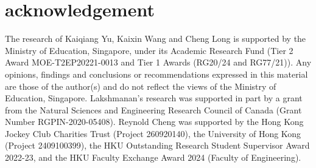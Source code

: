 \section{acknowledgement}
The research of Kaiqiang Yu, Kaixin Wang and Cheng Long is supported by the Ministry of Education, Singapore, under its Academic Research Fund (Tier 2 Award MOE-T2EP20221-0013 and Tier 1 Awards (RG20/24 and RG77/21)). Any opinions, findings and conclusions or recommendations expressed in this material are those of the author(s) and do not reflect the views of the Ministry of Education, Singapore.
%
Lakshmanan’s research was supported in part by a grant from
the Natural Sciences and Engineering Research Council of Canada (Grant Number RGPIN-2020-05408).
%
Reynold Cheng was supported by the Hong Kong Jockey Club Charities Trust (Project 260920140), the University of Hong Kong (Project 2409100399), the HKU Outstanding Research Student Supervisor Award 2022-23, and the HKU Faculty Exchange Award 2024 (Faculty of Engineering).